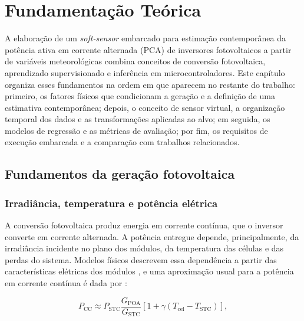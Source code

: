\chapter{Fundamentação Teórica}
\label{cap:fundamentacao-teorica}

A elaboração de um \textit{soft-sensor} embarcado para estimação contemporânea
da potência ativa em corrente alternada (PCA) de inversores fotovoltaicos a partir de
variáveis meteorológicas combina conceitos de conversão fotovoltaica,
aprendizado supervisionado e inferência em microcontroladores. Este capítulo
organiza esses fundamentos na ordem em que aparecem no restante do trabalho:
primeiro, os fatores físicos que condicionam a geração e a definição de uma
estimativa contemporânea; depois, o conceito de sensor virtual, a organização
temporal dos dados e as transformações aplicadas ao alvo; em seguida, os
modelos de regressão e as métricas de avaliação; por fim, os requisitos de
execução embarcada e a comparação com trabalhos relacionados.

\section{Fundamentos da geração fotovoltaica}
\label{sec:ft-geracao}

\subsection{Irradiância, temperatura e potência elétrica}
\label{subsec:ft-fv}

A conversão fotovoltaica produz energia em corrente contínua, que o
inversor converte em corrente alternada. A potência entregue depende,
principalmente, da irradiância incidente no plano dos módulos, da
temperatura das células e das perdas do sistema. Modelos físicos
descrevem essa dependência a partir das características elétricas dos
módulos \cite{desoto2006}, e uma aproximação usual para a potência em
corrente contínua é dada por \cite{dobos2014}:

\begin{equation}
\label{eq:ft-potencia-fv}
P_{\mathrm{CC}}\approx P_{\mathrm{STC}}
\frac{G_{\mathrm{POA}}}{G_{\mathrm{STC}}}
\left[1+\gamma\left(T_{\mathrm{cel}}-T_{\mathrm{STC}}\right)\right],
\end{equation}

